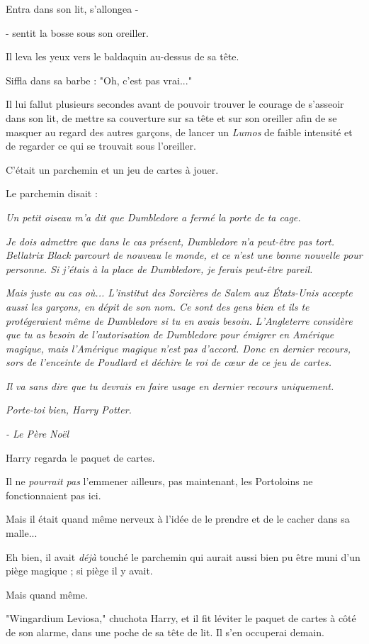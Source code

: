 Entra dans son lit, s'allongea -

- sentit la bosse sous son oreiller.

Il leva les yeux vers le baldaquin au-dessus de sa tête.

Siffla dans sa barbe : "Oh, c'est pas vrai..."

Il lui fallut plusieurs secondes avant de pouvoir trouver le courage de s'asseoir dans son lit, de mettre sa couverture sur sa tête et sur son oreiller afin de se masquer au regard des autres garçons, de lancer un \emph{Lumos}  de faible intensité et de regarder ce qui se trouvait sous l'oreiller.

C'était un parchemin et un jeu de cartes à jouer.

Le parchemin disait :

\emph{Un petit oiseau m'a dit que Dumbledore a fermé la porte de ta cage.} 

\emph{Je dois admettre que dans le cas présent, Dumbledore n'a peut-être pas tort. Bellatrix Black parcourt de nouveau le monde, et ce n'est une bonne nouvelle pour personne. Si j'étais à la place de Dumbledore, je ferais peut-être pareil.} 

\emph{Mais juste au cas où... L'institut des Sorcières de Salem aux États-Unis accepte aussi les garçons, en dépit de son nom. Ce sont des gens bien et ils te protégeraient même de Dumbledore si tu en avais besoin. L'Angleterre considère que tu as besoin de l'autorisation de Dumbledore pour émigrer en Amérique magique, mais l'Amérique magique n'est pas d'accord. Donc en dernier recours, sors de l'enceinte de Poudlard et déchire le roi de cœur de ce jeu de cartes.} 

\emph{Il va sans dire que tu devrais en faire usage en dernier recours uniquement.} 

\emph{Porte-toi bien, Harry Potter.} 

\emph{- Le Père Noël} 

Harry regarda le paquet de cartes.

Il ne \emph{pourrait pas}  l'emmener ailleurs, pas maintenant, les Portoloins ne fonctionnaient pas ici.

Mais il était quand même nerveux à l'idée de le prendre et de le cacher dans sa malle...

Eh bien, il avait \emph{déjà}  touché le parchemin qui aurait aussi bien pu être muni d'un piège magique ; si piège il y avait.

Mais quand même.

"Wingardium Leviosa," chuchota Harry, et il fit léviter le paquet de cartes à côté de son alarme, dans une poche de sa tête de lit. Il s'en occuperai demain.

